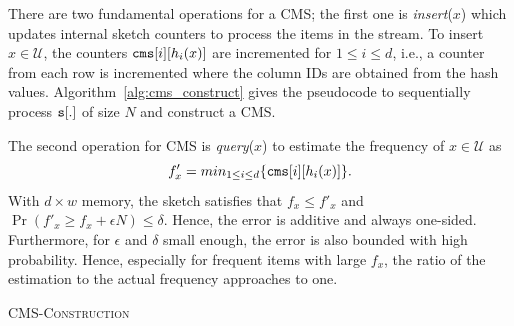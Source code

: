\documentclass[runningheads]{llncs}
\begin{document}
There are two fundamental operations for a CMS; the first one is {\em insert}($x$) which updates
 internal sketch counters to process the items in the stream. 
To insert $x \in \mathcal{U}$, the counters ${\tt cms}[i][h_i(x)]$ are incremented for $1 \leq i \leq d$, i.e., a counter from each row is incremented where the column IDs are obtained from the hash values. 
Algorithm~\ref{alg:cms_construct} gives the pseudocode to sequentially process  ${\tt s}[.]$ of size $N$ and construct a CMS. 
 
The second operation for CMS is {\em query}($x$) to estimate the frequency of $x \in \mathcal{U}$ as $$f'_x = min_{1 \leq i \leq d}\{{\tt cms}[i][h_i(x)]\}.$$
\noindent With $d \times w$ memory, the sketch satisfies that
 $f_x \leq f'_x$ and $\Pr\left(f'_x \geq f_x + \epsilon N\right) \leq \delta.$ Hence, the error is additive and always one-sided. Furthermore, for $\epsilon$ and $\delta$ small enough, the  error is also bounded with high probability. Hence, especially for frequent items with large $f_x$,  the ratio of the estimation to the actual frequency approaches to one.  
 
 \renewcommand{\baselinestretch}{0.9}
 \begin{algorithm}[htbp]
	\small
  	\caption{\textsc{CMS-Construction}} 
	\label{alg:cms_construct}
\end{algorithm} 	
\renewcommand{\baselinestretch}{1}
\vspace*{-4ex}
\end{document}
